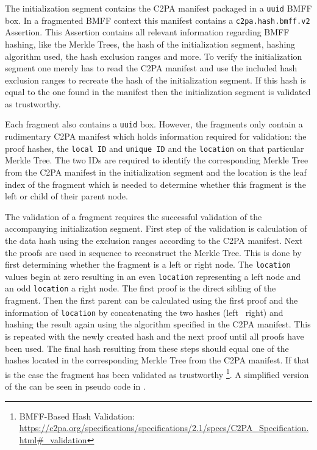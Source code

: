 The initialization segment contains the C2PA manifest packaged in a \texttt{uuid} BMFF box. In a fragmented BMFF context this manifest contains a \texttt{c2pa.hash.bmff.v2} Assertion. This Assertion contains all relevant information regarding BMFF hashing, like the Merkle Trees, the hash of the initialization segment, hashing algorithm used, the hash exclusion ranges and more. To verify the initialization segment one merely has to read the C2PA manifest and use the included hash exclusion ranges to recreate the hash of the initialization segment. If this hash is equal to the one found in the manifest then the initialization segment is validated as trustworthy.

Each fragment also contains a \texttt{uuid} box. However, the fragments only contain a rudimentary C2PA manifest which holds information required for validation: the proof hashes, the \texttt{local ID} and \texttt{unique ID} and the \texttt{location} on that particular Merkle Tree. The two IDs are required to identify the corresponding Merkle Tree from the C2PA manifest in the initialization segment and the location is the leaf index of the fragment which is needed to determine whether this fragment is the left or child of their parent node.

The validation of a fragment requires the successful validation of the accompanying initialization segment. First step of the validation is calculation of the data hash using the exclusion ranges according to the C2PA manifest. Next the proofs are used in sequence to reconstruct the Merkle Tree. This is done by first determining whether the fragment is a left or right node. The \texttt{location} values begin at zero resulting in an even \texttt{location} representing a left node and an odd \texttt{location} a right node. The first proof is the direct sibling of the fragment. Then the first parent can be calculated using the first proof and the information of \texttt{location} by concatenating the two hashes (left \ right) and hashing the result again using the algorithm specified in the C2PA manifest. This is repeated with the newly created hash and the next proof until all proofs have been used. The final hash resulting from these steps should equal one of the hashes located in the corresponding Merkle Tree from the C2PA manifest. If that is the case the fragment has been validated as trustworthy \footnote{BMFF-Based Hash Validation: \url{https://c2pa.org/specifications/specifications/2.1/specs/C2PA_Specification.html\#_validation}}. A simplified version of the can be seen in pseudo code in .

